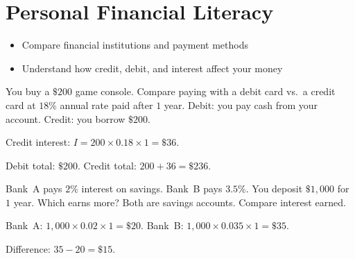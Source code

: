 \section{Personal Financial Literacy}

\begin{stepGoal}
\begin{itemize}
    \item Compare financial institutions and payment methods
    \item Understand how credit, debit, and interest affect your money
\end{itemize}
\end{stepGoal}

\begin{stepVocabBox}
\end{stepVocabBox}

\begin{stepsCard}
\end{stepsCard}

\begin{stepExample}{You buy a $\$200$ game console. Compare paying with a debit card vs.\ a credit card at $18\%$ annual rate paid after $1$ year.}
     Debit: you pay cash from your account. Credit: you borrow $\$200$.

     Credit interest: $I = 200 \times 0.18 \times 1 = \$36$.

     Debit total: $\$200$. Credit total: $200 + 36 = \$236$.
\end{stepExample}

\begin{stepExample}{Bank~A pays $2\%$ interest on savings. Bank~B pays $3.5\%$. You deposit $\$1{,}000$ for $1$ year. Which earns more?}
     Both are savings accounts. Compare interest earned.

     Bank~A: $1{,}000 \times 0.02 \times 1 = \$20$. Bank~B: $1{,}000 \times 0.035 \times 1 = \$35$.

     Difference: $35 - 20 = \$15$.
\end{stepExample}

